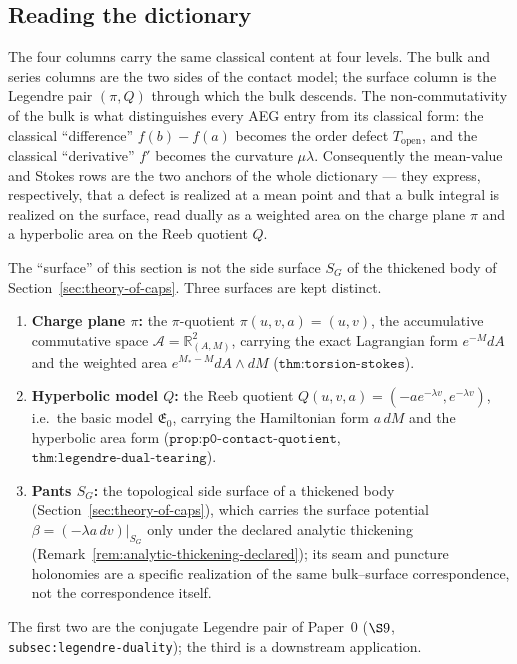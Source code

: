 \subsection{Reading the dictionary}

The four columns carry the same classical content at four levels.  The bulk and
series columns are the two sides of the contact model; the surface column is the
Legendre pair $(\pi,Q)$ through which the bulk descends.  The non-commutativity
of the bulk is what distinguishes every AEG entry from its classical form: the
classical ``difference'' $f(b)-f(a)$ becomes the order defect
$T_{\mathrm{open}}$, and the classical ``derivative'' $f'$ becomes the curvature
$\mu\lambda$.  Consequently the mean-value and Stokes rows are the two anchors
of the whole dictionary --- they express, respectively, that a defect is realized
at a mean point and that a bulk integral is realized on the surface, read dually
as a weighted area on the charge plane $\pi$ and a hyperbolic area on the Reeb
quotient $Q$.

\begin{remark}
\label{rem:surface-is-legendre-quotient}
The ``surface'' of this section is not the side surface $S_G$ of the thickened
body of Section~\ref{sec:theory-of-caps}.  Three surfaces are kept distinct.
\begin{enumerate}
  \item \textbf{Charge plane $\pi$:} the $\pi$-quotient $\pi(u,v,a)=(u,v)$, the
  accumulative commutative space $\mathcal A=\mathbb R^2_{(A,M)}$, carrying the
  exact Lagrangian form $e^{-M}dA$ and the weighted area
  $e^{M_*-M}dA\wedge dM$ ($\texttt{thm:torsion-stokes}$).
  \item \textbf{Hyperbolic model $Q$:} the Reeb quotient
  $Q(u,v,a)=(-ae^{-\lambda v},e^{-\lambda v})$, i.e.\ the basic model
  $\mathfrak E_0$, carrying the Hamiltonian form $a\,dM$ and the hyperbolic area
  form ($\texttt{prop:p0-contact-quotient}$,
  $\texttt{thm:legendre-dual-tearing}$).
  \item \textbf{Pants $S_G$:} the topological side surface of a thickened body
  (Section~\ref{sec:theory-of-caps}), which carries the surface potential
  $\beta=(-\lambda a\,dv)|_{S_G}$ only under the declared analytic thickening
  (Remark~\ref{rem:analytic-thickening-declared}); its seam and puncture
  holonomies are a specific realization of the same bulk--surface correspondence,
  not the correspondence itself.
\end{enumerate}
The first two are the conjugate Legendre pair of Paper~0
($\S9$, \texttt{subsec:legendre-duality}); the third is a downstream
application.
\end{remark}

